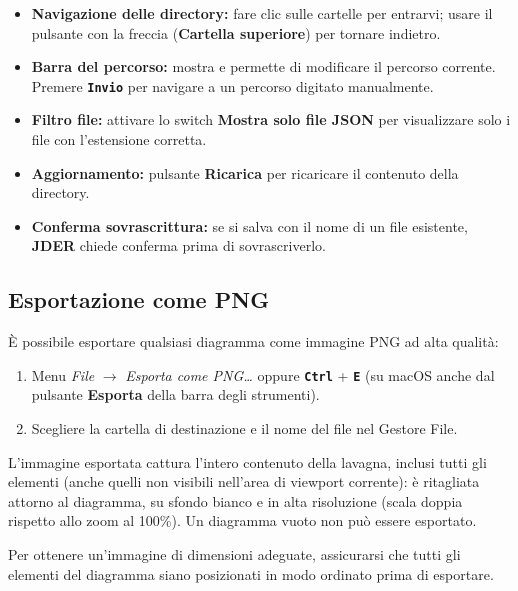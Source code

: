 \documentclass[a4paper,11pt]{article}
\newcommand{\key}[1]{\texttt{\textbf{#1}}}
\newcommand{\menu}[1]{\textit{#1}}
\newcommand{\uielement}[1]{\textbf{#1}}
\newcommand{\jder}{\textbf{JDER}}
\begin{document}
\begin{itemize}
  \item \textbf{Navigazione delle directory:} fare clic sulle cartelle per entrarvi; usare il
        pulsante con la freccia (\uielement{Cartella superiore}) per tornare indietro.
  \item \textbf{Barra del percorso:} mostra e permette di modificare il percorso corrente.
        Premere \key{Invio} per navigare a un percorso digitato manualmente.
  \item \textbf{Filtro file:} attivare lo switch \uielement{Mostra solo file JSON} per
        visualizzare solo i file con l'estensione corretta.
  \item \textbf{Aggiornamento:} pulsante \uielement{Ricarica} per ricaricare il contenuto della
        directory.
  \item \textbf{Conferma sovrascrittura:} se si salva con il nome di un file esistente,
        \jder{} chiede conferma prima di sovrascriverlo.
\end{itemize}

\subsection{Esportazione come PNG}

È possibile esportare qualsiasi diagramma come immagine PNG ad alta qualità:

\begin{enumerate}
  \item Menu \menu{File} $\to$ \menu{Esporta come PNG\ldots} oppure \key{Ctrl} + \key{E} (su macOS
        anche dal pulsante \uielement{Esporta} della barra degli strumenti).
  \item Scegliere la cartella di destinazione e il nome del file nel Gestore File.
\end{enumerate}

L'immagine esportata cattura l'intero contenuto della lavagna, inclusi tutti gli elementi
(anche quelli non visibili nell'area di viewport corrente): è ritagliata attorno al diagramma, su
sfondo bianco e in alta risoluzione (scala doppia rispetto allo zoom al 100\%). Un diagramma
vuoto non può essere esportato.

\begin{tcolorbox}[tipbox, title={Suggerimento}]
  Per ottenere un'immagine di dimensioni adeguate, assicurarsi che tutti gli elementi del
  diagramma siano posizionati in modo ordinato prima di esportare.
\end{tcolorbox}
\end{document}
